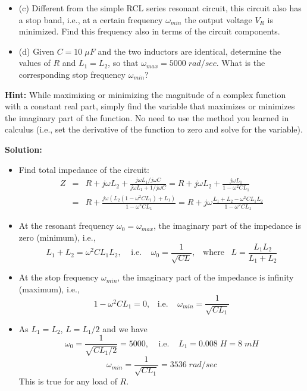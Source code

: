 \begin{enumerate}
\begin{itemize}
  \item (c) Different from the simple RCL series resonant circuit, this 
    circuit also has a stop band, i.e., at a certain frequency $\omega_{min}$
    the output voltage $V_R$ is minimized. Find this frequency also in terms
    of the circuit components. 

  \item (d) Given $C=10\;\mu F$ and the two inductors are identical, 
    determine the values of $R$ and $L_1=L_2$, so that $\omega_{max}=5000
    \;rad/sec$. What is the corresponding stop frequency $\omega_{min}$?
  \end{itemize}

  {\bf Hint:} While maximizing or minimizing the magnitude of a complex 
  function with a constant real part, simply find the variable that maximizes
  or minimizes the imaginary part of the function. No need to use the method 
  you learned in calculus (i.e., set the derivative of the function to zero
  and solve for the variable).



  {\bf Solution:}
  \begin{itemize}
  \item Find total impedance of the circuit:
  \begin{eqnarray}
   Z&=&R+j\omega L_2+\frac{j\omega L_1/j\omega C}{j\omega L_1+1/j\omega C}
  	=R+j\omega L_2+\frac{j\omega L_1}{1-\omega^2 CL_1}
  	\nonumber \\
  &=&R+\frac{j\omega(L_2(1-\omega^2CL_1)+L_1)}{1-\omega^2 CL_1}
  =R+j\omega \frac{L_1+L_2-\omega^2CL_1L_2}{1-\omega^2CL_1}
  	\nonumber 
  \end{eqnarray}
  \item At the resonant frequency $\omega_0=\omega_{max}$, the imaginary 
  part of the impedance is zero (minimum), i.e.,
  \[	L_1+L_2=\omega^2CL_1L_2,\;\;\;\;\mbox{i.e.}\;\;\;\;
  	\omega_0=\frac{1}{\sqrt{CL}},\;\;\;\mbox{where}\;\;\;
  	L=\frac{L_1L_2}{L_1+L_2}
  \]
  \item At the stop frequency $\omega_{min}$, the imaginary part of the 
  impedance is infinity (maximum), i.e.,
  \[	1-\omega^2CL_1=0, \;\;\;\mbox{i.e.}\;\;\;\;
  	\omega_{min}=\frac{1}{\sqrt{CL_1}}	\]
  
  \item As $L_1=L_2$, $L=L_1/2$ and we have
  \[ \omega_0=\frac{1}{\sqrt{CL_1/2}}=5000,\;\;\;\;\mbox{i.e.}\;\;\;\;
  	L_1=0.008\;H=8\;mH	\]
  \[ \omega_{min}=\frac{1}{\sqrt{CL_1}}=3536\;rad/sec	\]
  This is true for any load of $R$.
  
  \end{itemize} 


\end{enumerate}


